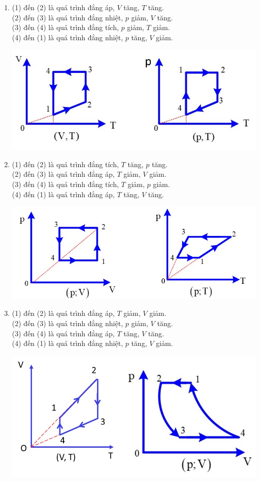 \begin{enumerate}[label=\bfseries Câu \arabic*:, leftmargin=1.7cm]
{\begin{enumerate}[label=\alph*)]
\begin{center}
	\end{center}
\item (1) đến (2) là quá trình đẳng áp, $V$ tăng, $T$ tăng.\\
(2) đến (3) là quá trình đẳng nhiệt, $p$ giảm, $V$ tăng.\\
(3) đến (4) là quá trình đẳng tích, $p$ giảm, $T$ giảm.\\
(4) đến (1) là quá trình đẳng nhiệt, $p$ tăng, $V$ giảm.
\begin{center}
	\includegraphics[width=0.65\linewidth]{../figs/VN12-Y24-PH-SYL-014P-12}
\end{center} 
\item (1) đến (2) là quá trình đẳng tích, $T$ tăng, $p$ tăng.\\
(2) đến (3) là quá trình đẳng áp, $T$ giảm, $V$ giảm.\\
(3) đến (4) là quá trình đẳng tích, $T$ giảm, $p$ giảm.\\
(4) đến (1) là quá trình đẳng áp, $T$ tăng, $V$ tăng.
\begin{center}
	\includegraphics[width=0.65\linewidth]{../figs/VN12-Y24-PH-SYL-014P-13}
\end{center}
\item (1) đến (2) là quá trình đẳng áp, $T$ giảm, $V$ giảm.\\
(2) đến (3) là quá trình đẳng nhiệt, $p$ giảm, $V$ tăng.\\
(3) đến (4) là quá trình đẳng áp, $T$ tăng, $V$ tăng.\\
(4) đến (1) là quá trình đẳng nhiệt, $p$ tăng, $V$ giảm.
\begin{center}
	\includegraphics[width=0.65\linewidth]{../figs/VN12-Y24-PH-SYL-014P-14.jpg}
\end{center}
\end{enumerate}
}


\end{enumerate}

